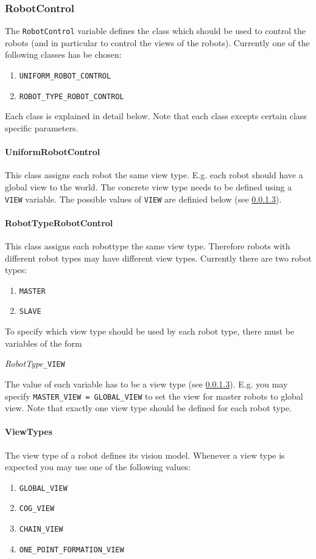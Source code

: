 \subsubsection{RobotControl}\label{sec:robotControl}
The \texttt{RobotControl} variable defines the class which should be used to control the robots (and in particular to control the views of the robots). Currently one of the following classes has be chosen:
\begin{enumerate}
	\item \texttt{UNIFORM\_ROBOT\_CONTROL}
	\item \texttt{ROBOT\_TYPE\_ROBOT\_CONTROL}
\end{enumerate}
Each class is explained in detail below. Note that each class excepts certain class specific parameters.

\paragraph{UniformRobotControl}\label{sec:uniformRobotControl}
This class assigns each robot the same view type. E.g. each robot should have a global view to the world. The concrete view type needs to be defined using a \texttt{VIEW} variable. The possible values of \texttt{VIEW} are definied below (see \ref{sec:viewtypes}).

\paragraph{RobotTypeRobotControl}\label{sec:robotTypeRobotControl}
This class assigns each robottype the same view type. Therefore robots with different robot types may have different view types. Currently there are two robot types:
\begin{enumerate}
	\item \texttt{MASTER}
	\item \texttt{SLAVE}
\end{enumerate}
To specify which view type should be used by each robot type, there must be variables of the form
\begin{center}
	\textit{RobotType}\texttt{\_VIEW}
\end{center}
The value of each variable has to be a view type (see \ref{sec:viewtypes}). E.g. you may specify \texttt{MASTER\_VIEW = GLOBAL\_VIEW} to set the view for master robots to global view. Note that exactly one view type should be defined for each robot type.

\paragraph{ViewTypes}\label{sec:viewtypes}
The view type of a robot defines its vision model. Whenever a view type is expected you may use one of the following values:
\begin{enumerate}
	\item \texttt{GLOBAL\_VIEW}
	\item \texttt{COG\_VIEW}
	\item \texttt{CHAIN\_VIEW}
	\item \texttt{ONE\_POINT\_FORMATION\_VIEW}
\end{enumerate}


